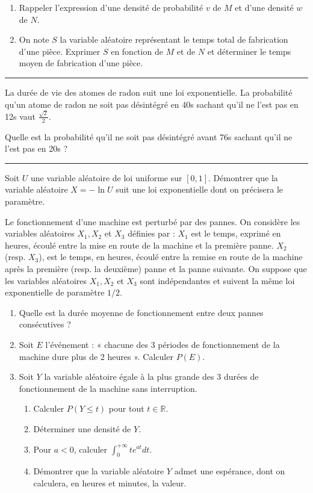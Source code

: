 \documentclass[../PolyS4.tex]{subfiles}
\begin{document}
\begin{enumerate}
\item Rappeler l'expression d'une densité de probabilité $v$ de $M$ et d'une densité $w$ de $N$.
\item On note $S$ la variable aléatoire représentant le temps total de fabrication d'une pièce. Exprimer $S$ en fonction de $M$ et de $N$ et déterminer le temps moyen de fabrication d'une pièce.
\end{enumerate}

\vspace{1em}
\hrule
\vspace{1em}


La durée de vie des atomes de radon suit une loi exponentielle. La probabilité qu'un atome de radon ne soit pas désintégré en 40s sachant qu'il ne l'est pas en 12s vaut $\frac{\sqrt{2}}{2}$. 

Quelle est la probabilité qu'il ne soit pas désintégré avant 76s sachant qu'il ne l'est pas en 20s ?

\vspace{1em}
\hrule
\vspace{1em}


Soit $U$ une variable aléatoire de loi uniforme sur $[0,1]$. Démontrer que la variable aléatoire $X=-\ln U$ suit une loi exponentielle dont on précisera le paramètre.

\newpage
{}

Le fonctionnement d'une machine est perturbé par des pannes. On considère les variables aléatoires $X_1, X_2$ et $X_3$ définies par : $X_1$ est le temps, exprimé en heures, écoulé entre la mise en route de la machine et la première panne. $X_2$ (resp. $X_3$), est le temps, en heures, écoulé entre la remise en route de la machine après la première (resp. la deuxième) panne et la panne suivante. On suppose que les variables aléatoires $X_1, X_2$ et $X_3$ sont indépendantes et suivent la même loi exponentielle de paramètre $1/2$.

\begin{enumerate}
\item Quelle est la durée moyenne de fonctionnement entre deux pannes consécutives ?
\item Soit $E$ l'événement : « chacune des 3 périodes de fonctionnement de la machine dure plus de 2 heures ». Calculer $P(E)$.
\item Soit $Y$ la variable aléatoire égale à la plus grande des 3 durées de fonctionnement de la machine sans interruption. 
\begin{enumerate}
\item Calculer $P(Y\leq t)$ pour tout $t\in\mathbb{R}$.
\item Déterminer une densité de $Y$.
\item Pour $a<0$, calculer $\int_0^{+\infty}te^{at}dt$.
\item Démontrer que la variable aléatoire $Y$ admet une espérance, dont on calculera, en heures et minutes, la valeur.
\end{enumerate}
\end{enumerate}
\end{document}
